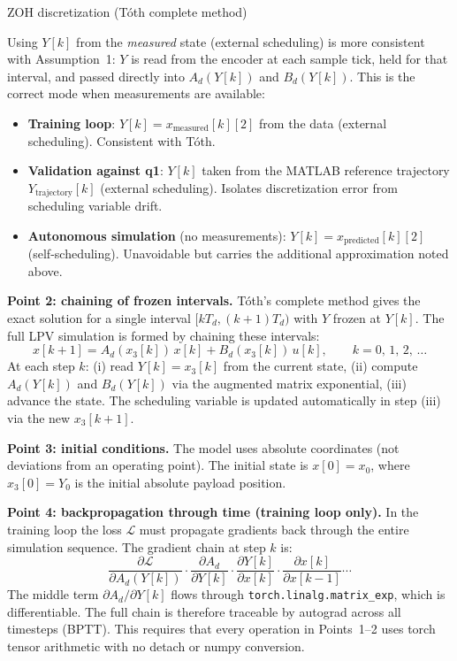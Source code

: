 \documentclass[11pt]{article}
\newcounter{derivstep}
\newenvironment{derivationstep}[1]
{
    \refstepcounter{derivstep}
    \begin{stepbox}{#1}
}
{
    \end{stepbox}
}
\begin{document}
\begin{derivationstep}{ZOH discretization (Tóth complete method)}
Using $Y[k]$ from the \emph{measured} state (external scheduling) is more consistent with
Assumption~1: $Y$ is read from the encoder at each sample tick, held for that interval, and
passed directly into $A_d(Y[k])$ and $B_d(Y[k])$. This is the correct mode when
measurements are available:
\begin{itemize}
    \item \textbf{Training loop}: $Y[k] = x_\text{measured}[k][2]$ from the data
    (external scheduling). Consistent with Tóth.
    \item \textbf{Validation against q1}: $Y[k]$ taken from the MATLAB reference
    trajectory $Y_\text{trajectory}[k]$ (external scheduling). Isolates discretization
    error from scheduling variable drift.
    \item \textbf{Autonomous simulation} (no measurements): $Y[k] = x_\text{predicted}[k][2]$
    (self-scheduling). Unavoidable but carries the additional approximation noted above.
\end{itemize}

\medskip
\textbf{Point 2: chaining of frozen intervals.}
Tóth's complete method gives the exact solution for a single interval $[kT_d, (k+1)T_d)$
with $Y$ frozen at $Y[k]$. The full LPV simulation is formed by chaining these intervals:
\[
    x[k+1] = A_d(x_3[k])\,x[k] + B_d(x_3[k])\,u[k], \qquad k = 0,\,1,\,2,\,\ldots
\]
At each step $k$: (i) read $Y[k] = x_3[k]$ from the current state, (ii) compute
$A_d(Y[k])$ and $B_d(Y[k])$ via the augmented matrix exponential, (iii) advance the state.
The scheduling variable is updated automatically in step (iii) via the new $x_3[k+1]$.

\medskip
\textbf{Point 3: initial conditions.}
The model uses absolute coordinates (not deviations from an operating point). The initial
state is $x[0] = x_0$, where $x_3[0] = Y_0$ is the initial absolute payload position.

\medskip
\textbf{Point 4: backpropagation through time (training loop only).}
In the training loop the loss $\mathcal{L}$ must propagate gradients back through the
entire simulation sequence. The gradient chain at step $k$ is:
\[
    \frac{\partial \mathcal{L}}{\partial A_d(Y[k])} \cdot
    \frac{\partial A_d}{\partial Y[k]} \cdot
    \frac{\partial Y[k]}{\partial x[k]} \cdot
    \frac{\partial x[k]}{\partial x[k-1]} \cdots
\]
The middle term $\partial A_d / \partial Y[k]$ flows through
\texttt{torch.linalg.matrix\_exp}, which is differentiable. The full chain is therefore
traceable by autograd across all timesteps (BPTT). This requires that every operation in
Points~1--2 uses torch tensor arithmetic with no detach or numpy conversion.


\end{derivationstep}
\end{document}
